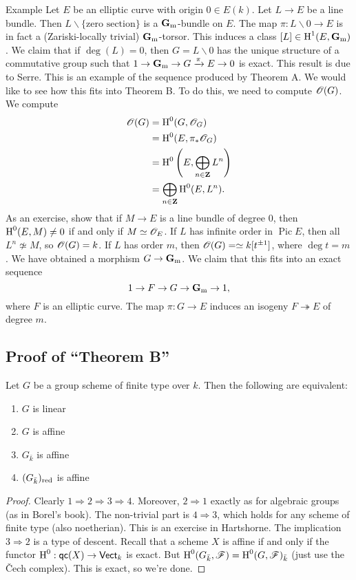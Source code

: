 \begin{enonce}[remark]{Example}
Let $E$ be an elliptic curve with origin $0\in E(k)$. Let $L\to E$ be a line 
bundle. Then $L\smallsetminus \{\text{zero section}\}$ is a $\mathbf{G}_{\mathrm{m}}$-bundle 
on $E$. The map $\pi:L\smallsetminus0 \to E$ is in fact a (Zariski-locally 
trivial) $\mathbf{G}_{\mathrm{m}}$-torsor. This induces a class $[L]\in \operatorname{H}^1(E,\mathbf{G}_{\mathrm{m}})$. 
We claim that if $\deg(L)=0$, then $G=L\smallsetminus 0$ has the unique structure 
of a commutative group such that $1 \to \mathbf{G}_{\mathrm{m}} \to G \xrightarrow\pi E \to 0$ 
is exact. This result is due to Serre. This is an example of the sequence produced 
by Theorem A. We would like to see how this fits into Theorem B. To do this, we 
need to compute $\mathscr{O}(G)$. We compute 
\begin{align*}
  \mathscr{O}(G) &= \operatorname{H}^0(G,\mathscr{O}_G) \\
    &= \operatorname{H}^0(E,\pi_\ast \mathscr{O}_G) \\
    &= \operatorname{H}^0\left(E,\bigoplus_{n\in \mathbf{Z}} L^n\right) \\
    &= \bigoplus_{n\in \mathbf{Z}} \operatorname{H}^0(E,L^n) .
\end{align*}
As an exercise, show that if $M\to E$ is a line bundle of degree $0$, then 
$\operatorname{H}^0(E,M)\ne 0$ if and only if $M\simeq \mathscr{O}_E$. If $L$ has infinite order 
in $\operatorname{Pic} E$, then all $L^n\not\simeq M$, so $\mathscr{O}(G)=k$. If 
$L$ has order $m$, then $\mathscr{O}(G)=\simeq k[t^{\pm 1}]$, where 
$\deg t=m$. We have obtained a morphism $G\to \mathbf{G}_{\mathrm{m}}$. We claim that this 
fits into an exact sequence 
\[
  1 \to F \to G \to \mathbf{G}_{\mathrm{m}} \to 1 ,
\]
where $F$ is an elliptic curve. The map $\pi:G\to E$ induces an isogeny 
$F\twoheadrightarrow E$ of degree $m$. 
\end{enonce}





\subsection{Proof of ``Theorem B''}

\begin{lemm}
Let $G$ be a group scheme of finite type over $k$. Then the following are 
equivalent:
\begin{enumerate}
  \item $G$ is linear
  \item $G$ is affine 
  \item $G_{\bar k}$ is affine
  \item $(G_{\bar k})_{\mathrm{red}}$ is affine
\end{enumerate}
\end{lemm}
\begin{proof}
Clearly $1 \Rightarrow 2 \Rightarrow3\Rightarrow 4$. Moreover, 
$2\Rightarrow 1$ exactly as for algebraic groups (as in Borel's book). The 
non-trivial part is $4\Rightarrow 3$, which holds for any scheme of finite 
type (also noetherian). This is an exercise in Hartshorne. The implication 
$3\Rightarrow 2$ is a type of descent. Recall that a scheme $X$ is affine if 
and only if the functor $\operatorname{H}^0:\mathsf{qc}(X) \to \mathsf{Vect}_k$ is 
exact. But $\operatorname{H}^0(G_{\bar k},\mathscr{F}) = \operatorname{H}^0(G,\mathscr{F})_{\bar k}$ (just use the 
\v Cech complex). This is exact, so we're done. 
\end{proof}

